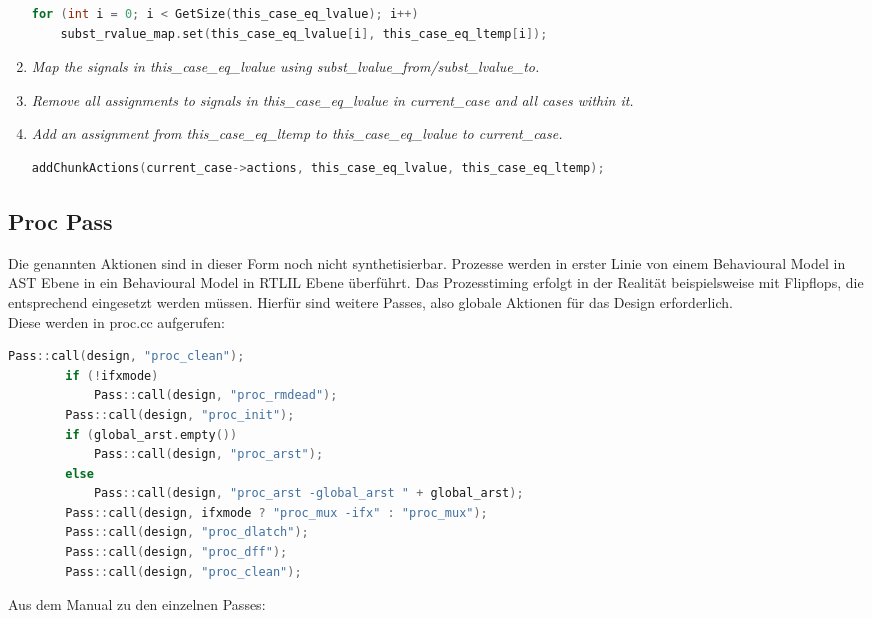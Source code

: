 \documentclass[11pt]{report}
\begin{document}
\begin{enumerate}
\begin{lstlisting}[language=C++]
for (int i = 0; i < GetSize(this_case_eq_lvalue); i++)
	subst_rvalue_map.set(this_case_eq_lvalue[i], this_case_eq_ltemp[i]);
\end{lstlisting}
\item \textit{Map the signals in this\_case\_eq\_lvalue using subst\_lvalue\_from/subst\_lvalue\_to.}
\item \textit{Remove all assignments to signals in this\_case\_eq\_lvalue in current\_case and all cases within it.}
\item \textit{Add an assignment from this\_case\_eq\_ltemp to this\_case\_eq\_lvalue to current\_case.}
\begin{lstlisting}[language=C++]
addChunkActions(current_case->actions, this_case_eq_lvalue, this_case_eq_ltemp);
\end{lstlisting}
\end{enumerate}


\subsection{Proc Pass}
Die genannten Aktionen sind in dieser Form noch nicht synthetisierbar. Prozesse werden in erster Linie von einem Behavioural Model in AST Ebene in ein Behavioural Model in RTLIL Ebene überführt. Das Prozesstiming erfolgt in der Realität beispielsweise mit Flipflops, die entsprechend eingesetzt werden müssen. Hierfür sind weitere Passes, also globale Aktionen für das Design erforderlich.\\
Diese werden in proc.cc aufgerufen:
\begin{lstlisting}[language=C++]
		Pass::call(design, "proc_clean");
		if (!ifxmode)
			Pass::call(design, "proc_rmdead");
		Pass::call(design, "proc_init");
		if (global_arst.empty())
			Pass::call(design, "proc_arst");
		else
			Pass::call(design, "proc_arst -global_arst " + global_arst);
		Pass::call(design, ifxmode ? "proc_mux -ifx" : "proc_mux");
		Pass::call(design, "proc_dlatch");
		Pass::call(design, "proc_dff");
		Pass::call(design, "proc_clean");
\end{lstlisting}
Aus dem Manual zu den einzelnen Passes:
\\
\\
\end{document}
